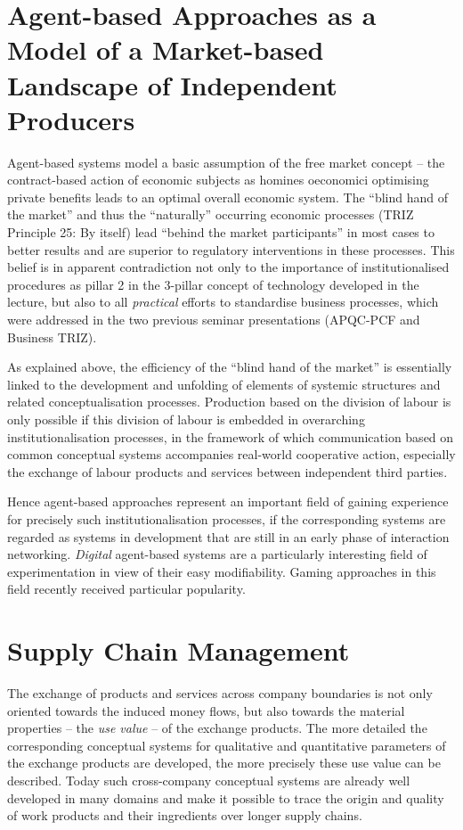 \documentclass[11pt,a4paper]{article}
\begin{document}
\section{Agent-based Approaches as a Model of a Market-based\\ Landscape of
  Independent Producers} 

Agent-based systems model a basic assumption of the free market concept -- the
contract-based action of economic subjects as homines oeconomici optimising
private benefits leads to an optimal overall economic system. The
\enquote{blind hand of the market} and thus the \enquote{naturally} occurring
economic processes (TRIZ Principle 25: By itself) lead \enquote{behind the
  market participants} in most cases to better results and are superior to
regulatory interventions in these processes. This belief is in apparent
contradiction not only to the importance of institutionalised procedures as
pillar 2 in the 3-pillar concept of technology developed in the lecture, but
also to all \emph{practical} efforts to standardise business processes, which
were addressed in the two previous seminar presentations (APQC-PCF and
Business TRIZ).

As explained above, the efficiency of the \enquote{blind hand of the market}
is essentially linked to the development and unfolding of elements of systemic
structures and related conceptualisation processes. Production based on the
division of labour is only possible if this division of labour is embedded in
overarching institutionalisation processes, in the framework of which
communication based on common conceptual systems accompanies real-world
cooperative action, especially the exchange of labour products and services
between independent third parties.

Hence agent-based approaches represent an important field of gaining
experience for precisely such institutionalisation processes, if the
corresponding systems are regarded as systems in development that are still in
an early phase of interaction networking. \emph{Digital} agent-based systems
are a particularly interesting field of experimentation in view of their easy
modifiability. Gaming approaches in this field recently received particular
popularity.

\section{Supply Chain Management}

The exchange of products and services across company boundaries is not only
oriented towards the induced money flows, but also towards the material
properties -- the \emph{use value} -- of the exchange products. The more
detailed the corresponding conceptual systems for qualitative and quantitative
parameters of the exchange products are developed, the more precisely these
use value can be described. Today such cross-company conceptual systems are
already well developed in many domains and make it possible to trace the
origin and quality of work products and their ingredients over longer supply
chains.
\end{document}
